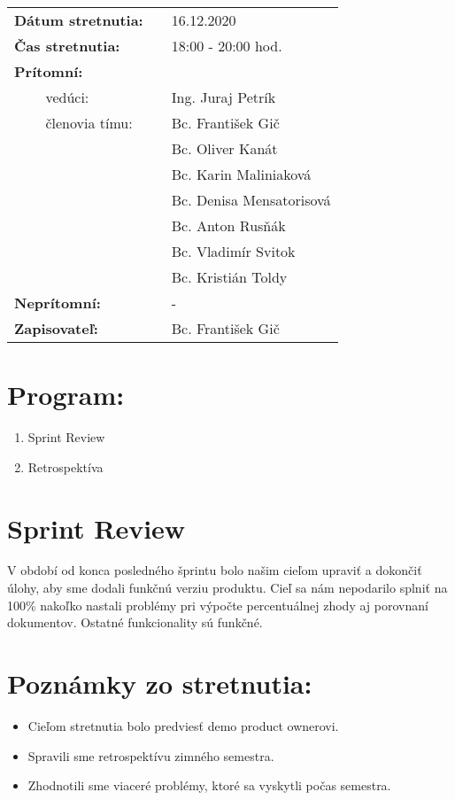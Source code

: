 \documentclass{article}
\begin{document}
    

    \begin{table}[h]
        \begin{tabular}{lllll}
            \multicolumn{3}{l}{\textbf{Dátum stretnutia:}} & & 16.12.2020 \\
            \multicolumn{3}{l}{\textbf{Čas stretnutia:}} & & 18:00 - 20:00 hod. \\
            \multicolumn{3}{l}{\textbf{Prítomní:}} \\
            & & vedúci: & & Ing. Juraj Petrík \\
            & & členovia tímu: & & Bc. František Gič  \\
            & & & & Bc. Oliver Kanát \\
            & & & & Bc. Karin Maliniaková \\
            & & & & Bc. Denisa Mensatorisová \\
            & & & & Bc. Anton Rusňák \\
            & & & & Bc. Vladimír Svitok \\
            & & & & Bc. Kristián Toldy \\
            \multicolumn{3}{l}{\textbf{Neprítomní:}} & & -\\
            \multicolumn{3}{l}{\textbf{Zapisovateľ:}} & & Bc. František Gič \\
        \end{tabular}
        \label{tab:grades}
    \end{table}

    \section*{Program:}
    
    \begin{enumerate}
        \item Sprint Review
        \item Retrospektíva
    \end{enumerate}

    \section*{Sprint Review}

        \textnormal {V období od konca posledného šprintu bolo našim cieľom upraviť a dokončiť úlohy, aby sme dodali funkčnú verziu produktu.
        Cieľ sa nám nepodarilo splniť na 100\% nakoľko nastali problémy pri výpočte percentuálnej zhody aj porovnaní dokumentov. Ostatné funkcionality sú funkčné. }

    \section*{Poznámky zo stretnutia:}

    \begin{itemize}
        \item Cieľom stretnutia bolo predviesť demo product ownerovi.
        \item Spravili sme retrospektívu zimného semestra.
        \item Zhodnotili sme viaceré problémy, ktoré sa vyskytli počas semestra. 
    \end{itemize}
\end{document}
